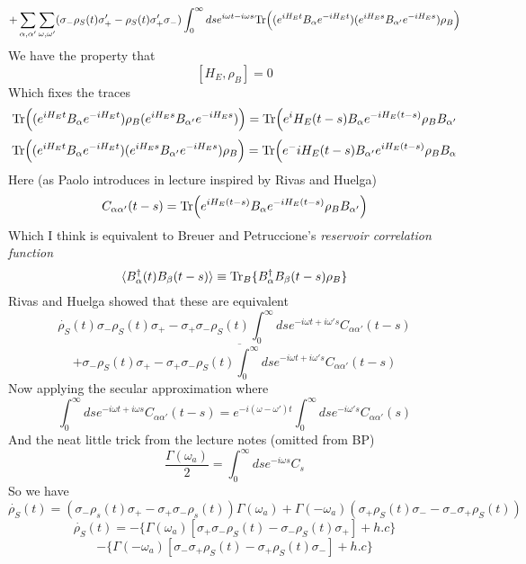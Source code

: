\documentclass[12pt]{article}
\newcommand{\Tr}{{\rm Tr}}
\begin{document}
\begin{enumerate}
$$ + \sum_{\alpha, \alpha'} \sum_{\omega, \omega'} ( \sigma_- \rho_S (t) \sigma_+' - \rho_S (t) \sigma_+' \sigma_- ) \int_0^{\infty} ds e^{i \omega t - i \omega s} \Tr \Big( ( e^{i H_E t} B_{\alpha} e^{-i H_E t} ) (e^{i H_E s} B_{\alpha'} e^{-i H_E s} )  \rho_B \Big) $$
We have the property that 
$$ [H_E, \rho_B] = 0 $$ 
Which fixes the traces 
$$ \Tr \Big( (e^{i H_E t} B_{\alpha} e^{-i H_E t} ) \rho_B ( e^{i H_E s} B_{\alpha'} e^{-i H_E s}  )\Big) = \Tr \Big( e^i H_E (t-s) B_{\alpha} e^{-i H_E (t-s) } \rho_B B_{\alpha'}  $$
$$ \Tr \Big( (e^{i H_E t} B_{\alpha} e^{-i H_E t} )  ( e^{i H_E s} B_{\alpha'} e^{-i H_E s}  ) \rho_B \Big) = \Tr \Big( e^-i H_E (t-s) B_{\alpha'} e^{i H_E (t-s) } \rho_B B_{\alpha}  $$ 
Here (as Paolo introduces in lecture inspired by Rivas and Huelga) 
$$ C_{\alpha \alpha' } (t-s) = \Tr \Big( e^{i H_E (t-s) } B_{\alpha} e^{-i H_E (t-s) } \rho_B B_{\alpha'} \Big) $$
Which I think is equivalent to Breuer and Petruccione's \emph{reservoir correlation function} 
$$ \langle B_{\alpha}^{\dagger} (t) B_{\beta} (t-s) \rangle \equiv \Tr_B \{ B_{\alpha}^{\dagger} B_{\beta} (t-s) \rho_B \} $$
Rivas and Huelga showed that these are equivalent 
$$ \dot{\rho_S} (t) \sigma_- \rho_S (t) \sigma_+ - \sigma_+ \sigma_- \rho_S (t) \int_0^{\infty} ds e^{-i \omega t + i \omega' s} C_{\alpha \alpha' } (t-s) $$
$$ + \overline{\sigma_- \rho_S (t) \sigma_+ - \sigma_+ \sigma_- \rho_S (t) \int_0^{\infty} ds e^{-i \omega t + i \omega' s} C_{\alpha \alpha' } (t-s) } $$
Now applying the secular approximation where 
$$ \int_0^{\infty} ds e^{-i \omega t + i \omega s} C_{\alpha \alpha'} (t-s) = e^{-i ( \omega - \omega') t} \int_0^{\infty} ds e^{-i \omega' s} C_{\alpha \alpha'} (s) $$
And the neat little trick from the lecture notes (omitted from BP) 
$$  \frac{\Gamma (\omega_a)}{2} = \int_0^{\infty} ds e^{-i \omega s} C_s $$
So we have 
$$ \dot{\rho_S}(t) = ( \sigma_- \rho_s (t) \sigma_+ - \sigma_+ \sigma_- \rho_s (t) )   \Gamma (\omega_a) + \Gamma (- \omega_a) ( \sigma_+ \rho_S (t) \sigma_- - \sigma_- \sigma_+ \rho_S (t) ) $$
$$ \dot{\rho_S} (t) = - \{ \Gamma (\omega_a ) [ \sigma_+ \sigma_- \rho_S (t) - \sigma_- \rho_S (t) \sigma_+ ] + h.c\} $$
$$ - \{ \Gamma (- \omega_a) [ \sigma_- \sigma_+ \rho_S (t) - \sigma_+ \rho_S (t) \sigma_- ] + h.c \} $$


\end{enumerate}
\end{document}
